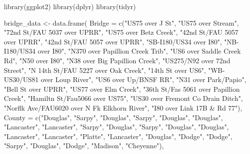 \documentclass[
  letterpaper,
  DIV=11,
  numbers=noendperiod]{scrreprt}
\newenvironment{Shaded}{\begin{snugshade}}{\end{snugshade}}
\newcommand{\AttributeTok}[1]{\textcolor[rgb]{0.40,0.45,0.13}{#1}}
\newcommand{\FunctionTok}[1]{\textcolor[rgb]{0.28,0.35,0.67}{#1}}
\newcommand{\NormalTok}[1]{\textcolor[rgb]{0.00,0.23,0.31}{#1}}
\newcommand{\OtherTok}[1]{\textcolor[rgb]{0.00,0.23,0.31}{#1}}
\newcommand{\StringTok}[1]{\textcolor[rgb]{0.13,0.47,0.30}{#1}}
\begin{document}
\begin{Shaded}
\begin{Highlighting}[]
\FunctionTok{library}\NormalTok{(ggplot2)}
\FunctionTok{library}\NormalTok{(dplyr)}
\FunctionTok{library}\NormalTok{(tidyr)}

\NormalTok{bridge\_data }\OtherTok{\textless{}{-}} \FunctionTok{data.frame}\NormalTok{(}
  \AttributeTok{Bridge =} \FunctionTok{c}\NormalTok{(}\StringTok{"US75 over J St"}\NormalTok{, }\StringTok{"US75 over Stream"}\NormalTok{, }\StringTok{"72nd St/FAU 5037 over UPRR"}\NormalTok{, }\StringTok{"US75 over Betz Creek"}\NormalTok{, }
             \StringTok{"42nd St/FAU 5057 over UPRR"}\NormalTok{, }\StringTok{"42nd St/FAU 5057 over UPRR"}\NormalTok{, }\StringTok{"SB{-}I180/US34 over I80"}\NormalTok{, }
             \StringTok{"NB{-}I180/US34 over I80"}\NormalTok{, }\StringTok{"N370 over Papillion Creek Trib"}\NormalTok{, }\StringTok{"US6 over Saddle Creek Rd"}\NormalTok{, }
             \StringTok{"N50 over I80"}\NormalTok{, }\StringTok{"N38 over Big Papillion Creek"}\NormalTok{, }\StringTok{"US275/N92 over 72nd Street"}\NormalTok{, }
             \StringTok{"N 14th St/FAU 5227 over Oak Creek"}\NormalTok{, }\StringTok{"14th St over US6"}\NormalTok{, }\StringTok{"WB{-}US30/US81 over Loup River"}\NormalTok{, }
             \StringTok{"US6 over Up/BNSF RR"}\NormalTok{, }\StringTok{"N31 over Park/Papio"}\NormalTok{, }\StringTok{"Bell St over UPRR"}\NormalTok{, }\StringTok{"US77 over Elm Creek"}\NormalTok{, }
             \StringTok{"36th St/Fas 5061 over Papillion Creek"}\NormalTok{, }\StringTok{"Hamiltn St/Fau5066 over US75"}\NormalTok{, }\StringTok{"US30 over Fremont Co Drain Ditch"}\NormalTok{, }
             \StringTok{"Norflk Ave/FAU6020 over N Fk Elkhorn River"}\NormalTok{, }\StringTok{"I80 over Link 17B \& Rd 77"}\NormalTok{),}
  \AttributeTok{County =} \FunctionTok{c}\NormalTok{(}\StringTok{"Douglas"}\NormalTok{, }\StringTok{"Sarpy"}\NormalTok{, }\StringTok{"Douglas"}\NormalTok{, }\StringTok{"Sarpy"}\NormalTok{, }\StringTok{"Douglas"}\NormalTok{, }\StringTok{"Douglas"}\NormalTok{, }\StringTok{"Lancaster"}\NormalTok{, }\StringTok{"Lancaster"}\NormalTok{, }
             \StringTok{"Sarpy"}\NormalTok{, }\StringTok{"Douglas"}\NormalTok{, }\StringTok{"Sarpy"}\NormalTok{, }\StringTok{"Douglas"}\NormalTok{, }\StringTok{"Douglas"}\NormalTok{, }\StringTok{"Lancaster"}\NormalTok{, }\StringTok{"Lancaster"}\NormalTok{, }\StringTok{"Platte"}\NormalTok{, }
             \StringTok{"Lancaster"}\NormalTok{, }\StringTok{"Douglas"}\NormalTok{, }\StringTok{"Dodge"}\NormalTok{, }\StringTok{"Dodge"}\NormalTok{, }\StringTok{"Sarpy"}\NormalTok{, }\StringTok{"Douglas"}\NormalTok{, }\StringTok{"Dodge"}\NormalTok{, }\StringTok{"Madison"}\NormalTok{, }\StringTok{"Cheyenne"}\NormalTok{),}

\end{Highlighting}
\end{Shaded}
\end{document}
